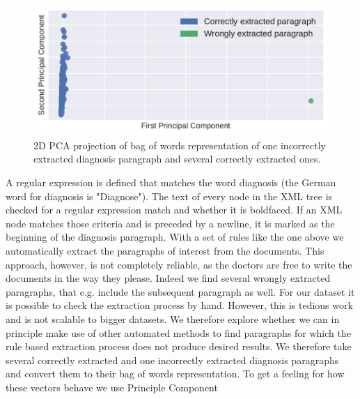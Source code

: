 
\bigskip
\begin{figure}
	\includegraphics[width=\linewidth]{figures/bow_find_odd}
	\caption{2D PCA projection of bag of words representation of one incorrectly extracted diagnosis paragraph and several correctly extracted ones.}
	\label{fig:bow_find_odd}
\end{figure}
A regular expression is defined that matches the word diagnosis (the German word for diagnosis is "Diagnose").
The text of every node in the XML tree is checked for a regular expression match and whether it is boldfaced. If an XML node matches those criteria and is preceded by a newline, it is marked as the beginning of the diagnosis paragraph.
With a set of rules like the one above we automatically extract the
paragraphs of interest from the documents. This approach, however,
is not completely reliable, as the doctors are free to write the documents
in the way they please. Indeed we find several wrongly extracted paragraphs,
that e.g. include the subsequent paragraph as well. For our dataset
it is possible to check the extraction process by hand. However, this
is tedious work and is not scalable to bigger
datasets. We therefore explore whether we can in principle make use
of other automated methods to find paragraphs for which the rule based extraction
process does not produce desired results. We therefore take several correctly extracted and one incorrectly extracted
diagnosis paragraphs and convert them to their bag of words representation.
To get a feeling for how these vectors behave we use Principle Component
